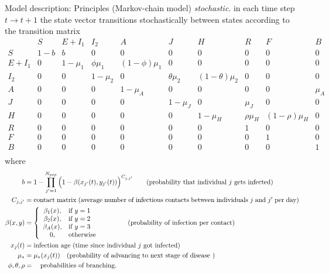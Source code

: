 \documentclass{beamer}
\begin{document}
\begin{frame}{Model description: Principles (Markov-chain model)}
\textit{stochastic}. in each time step $t\to t+1$ the state vector transitions stochastically  between states according to the transition  matrix {\tiny 
   \[ \left. \begin{array}{c|ccccccccc}
   & S & E+I_1 & I_2 & A & J & H & R & F & B \\
  \hline 
S & 1-b& b& 0 & 0 & 0 & 0 & 0 & 0 & 0 \\
   E+I_1 &0 & 1-\mu _1 & \phi \mu _1 & (1-\phi)\mu _1 & 0 & 0 & 0 & 0 & 0 \\
 I_2 & 0 & 0 & 1-\mu _2 & 0 &\theta \mu _2 & (1-\theta )\mu _2 & 0 & 0 & 0   \\
  A & 0 & 0 & 0 &  1-\mu _A  & 0 & 0 & 0 & 0  & \mu _A   \\
   J &  0 & 0 & 0 & 0 & 1-\mu _J  & 0 & \mu _J & 0  & 0   \\
    H &  0 & 0 & 0 & 0 & 0  & 1-\mu _H & \rho \mu _H & (1-\rho )\mu _H  & 0  \\
     R &  0 & 0 & 0 & 0 & 0  & 0 & 1 & 0  & 0   \\
       F &  0 & 0 & 0 & 0 & 0  & 0 & 0 & 1  & 0   \\
         B &  0 & 0 & 0 & 0 & 0  & 0 & 0 & 0  & 1   \\
   \end{array} \right. \]  } \pause 
{\tiny  where 
\begin{align*}   
 b &= 1- \prod_{j'=1}^{N_{pop}} \Big(1-  \beta (x_{j'}(t),y_{j'}(t))\Big)^{C_{j,j'}} \qquad \textrm{(probability that individual $j$ gets infected)} \\
 C_{j,j'} &= \parbox[t]{14cm}{ contact matrix (average number of infectious contacts between  individuals $j$ and $j'$ per day)}\\
 \beta (x,y) & = \left\{ \begin{array}{cl} \beta _1(x) , & \textrm{if } y = 1 \\
 \beta _2(x) , & \textrm{if } y = 2 \\
 \beta _A(x) , & \textrm{if } y  = 3 \\
 0 , & \textrm{otherwise}
\end{array} \right.   \qquad \qquad \textrm{(probability of infection per contact)} \\
 x_{j}(t) &=  \textrm{infection age (time since individual $j$ got infected)} \\
 \mu _*  &= \mu _* (x_j(t)) %
 \quad \parbox[t]{10cm}{(probability of advancing to  next stage of disease )} 
 \\ \phi ,\theta ,\rho & =  \quad \textrm{probabilities of branching.}
\end{align*} }
  \end{frame}
\end{document}
